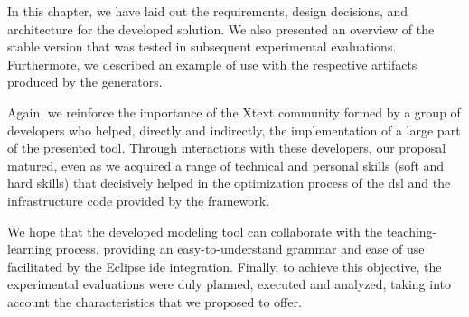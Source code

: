 In this chapter, we have laid out the requirements, design decisions, and architecture for the developed solution.
We also presented an overview of the stable version that was tested in subsequent experimental evaluations.
Furthermore, we described an example of use with the respective artifacts produced by the generators.

Again, we reinforce the importance of the Xtext community formed by a group of developers who helped, directly and indirectly, the implementation of a large part of the presented tool.
Through interactions with these developers, our proposal matured,  even as we acquired a range of technical and personal skills (soft and hard skills) that decisively helped in the optimization process of the \ac{dsl} and the infrastructure code provided by the framework.

We hope that the developed modeling tool can collaborate with the teaching-learning process, providing an easy-to-understand grammar and ease of use facilitated by the Eclipse \ac{ide} integration.
Finally, to achieve this objective, the experimental evaluations were duly planned, executed and analyzed, taking into account the characteristics that we proposed to offer.


